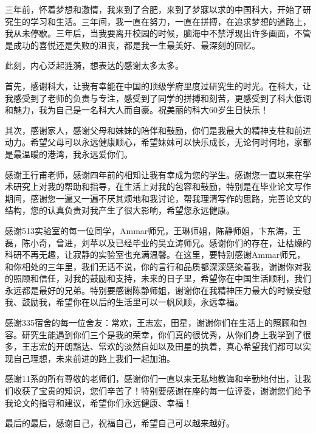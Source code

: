 \begin{acknowledgements}
三年前，怀着梦想和激情，我来到了合肥，来到了梦寐以求的中国科大，开始了研究生的学习和生活。三年间，我一直在努力，一直在拼搏，在追求梦想的道路上，我从未停歇。三年后，当我要离开校园的时候，脑海中不禁浮现出许多画面，不管是成功的喜悦还是失败的沮丧，都是我一生最美好、最深刻的回忆。

此刻，内心泛起涟漪，想表达的感谢太多太多。

首先，感谢科大，让我有幸能在中国的顶级学府里度过研究生的时光。在科大，让我感受到了老师的负责与专注，感受到了同学的拼搏和刻苦，更感受到了科大低调和魅力，我为自己是一名科大人而自豪。祝美丽的科大60岁生日快乐！

其次，感谢家人，感谢父母和妹妹的陪伴和鼓励，你们是我最大的精神支柱和前进动力。希望父母可以永远健康顺心，希望妹妹可以快乐成长，无论何时何地，家都是最温暖的港湾，我永远爱你们。

感谢王行甫老师，感谢四年前的相知让我有幸成为您的学生。感谢您一直以来在学术研究上对我的帮助和指导，在生活上对我的包容和鼓励，特别是在毕业论文写作期间，感谢您一遍又一遍不厌其烦地和我讨论，帮我理清写作的思路，完善论文的结构，您的认真负责对我产生了很大影响，希望您永远健康。

感谢513实验室的每一位同学，Ammar师兄，王琳师姐，陈静师姐，卞东海，王磊，陈小奇，曾进，刘苹以及已经毕业的吴立涛师兄。感谢你们的存在，让枯燥的科研不再无趣，让寂静的实验室也充满温馨。在这里，要特别感谢Ammar师兄，和你相处的三年里，我们无话不说，你的言行和品质都深深感染着我，谢谢你对我的照顾和信任，对我的鼓励和支持，未来的日子里，希望你在中国生活顺利，我们永远都是最好的兄弟。特别要感谢陈静师姐，谢谢你在我精神压力最大的时候安慰我、鼓励我，希望你在以后的生活里可以一帆风顺，永远幸福。

感谢335宿舍的每一位舍友：常欢，王志宏，田星，谢谢你们在生活上的照顾和包容。研究生能遇到你们三个是我的荣幸，你们真的很优秀，从你们身上我学到了很多，王志宏的开朗豁达、常欢的淡然自如以及田星的执着，真心希望我们都可以实现自己理想，未来前进的路上我们一起加油。

感谢11系的所有尊敬的老师们，感谢你们一直以来无私地教诲和辛勤地付出，让我们收获了宝贵的知识，您们辛苦了！特别要感谢在座的每一位评委，谢谢您们给予我论文的指导和建议，希望你们永远健康、幸福！

最后的最后，感谢自己，祝福自己，希望自己可以越来越好。



\cleardoublepage
\end{acknowledgements}
